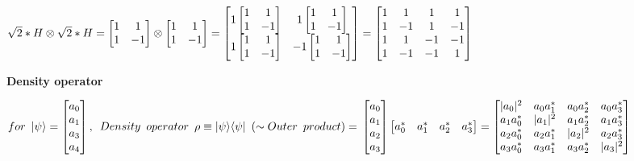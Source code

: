 \documentclass[11pt, fleqn]{article}
\begin{document}
$\sqrt{2}*H\otimes \sqrt{2}*H = \begin{bmatrix}1&1\\1&-1\end{bmatrix}\otimes
\begin{bmatrix}1&1\\1&-1\end{bmatrix} =
\begin{bmatrix}1\begin{bmatrix}1&1\\1&-1\end{bmatrix}&1\begin{bmatrix}1&1\\1&-1\end{bmatrix}\\1\begin{bmatrix}1&1\\1&-1\end{bmatrix}&-1\begin{bmatrix}1&1\\1&-1\end{bmatrix}\end{bmatrix}=
\begin{bmatrix}1&1&1&1\\1&-1&1&-1\\1&1&-1&-1\\1&-1&-1&1\\\end{bmatrix}
\\~\\$


\bf{Density operator\\}

$
for \hspace{0.5em} |\psi \rangle = \begin{bmatrix} a_0 \\ a_1 \\a_3 \\ a_4 \end{bmatrix}, \hspace{0.5em}
Density \hspace{0.5em} operator \hspace{0.5em} \rho \equiv  | \psi \rangle \langle \psi | \hspace{0.5em} (\sim Outer \hspace{0.5em} product)=\\
\begin{bmatrix} a_0 \\ a_1 \\a_2 \\ a_3 \end{bmatrix} \begin{bmatrix} a_0^* & a_1^* & a_2^* & a_3^* \end{bmatrix} =
\begin{bmatrix} |a_0|^2 & a_0  a_1^*& a_0  a_2^*  & a_0  a_3^*  \\ a_1  a_0^*& |a_1|^2 & a_1  a_2^*  & a_1  a_3^* \\ 
a_2  a_0^*& a_2  a_1^*  & |a_2|^2 & a_2  a_3^* \\ a_3  a_0^*& a_3  a_1^*& a_3  a_2^*  & |a_3|^2 \end{bmatrix}
$
\end{document}
